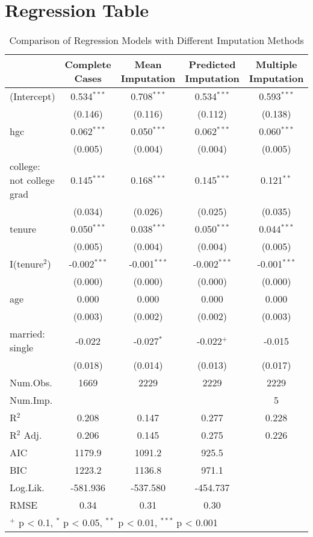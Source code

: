 \documentclass{article}
\begin{document}
\section{Regression Table}
\begin{table}[htbp]
\centering
\begin{tabular}{lcccc}
\hline
 & Complete Cases & Mean Imputation & Predicted Imputation & Multiple Imputation \\
\hline
(Intercept) & 0.534$^{***}$ & 0.708$^{***}$ & 0.534$^{***}$ & 0.593$^{***}$ \\
 & (0.146) & (0.116) & (0.112) & (0.138) \\
hgc & 0.062$^{***}$ & 0.050$^{***}$ & 0.062$^{***}$ & 0.060$^{***}$ \\
 & (0.005) & (0.004) & (0.004) & (0.005) \\
college: not college grad & 0.145$^{***}$ & 0.168$^{***}$ & 0.145$^{***}$ & 0.121$^{**}$ \\
 & (0.034) & (0.026) & (0.025) & (0.035) \\
tenure & 0.050$^{***}$ & 0.038$^{***}$ & 0.050$^{***}$ & 0.044$^{***}$ \\
 & (0.005) & (0.004) & (0.004) & (0.005) \\
I(tenure$^2$) & -0.002$^{***}$ & -0.001$^{***}$ & -0.002$^{***}$ & -0.001$^{***}$ \\
 & (0.000) & (0.000) & (0.000) & (0.000) \\
age & 0.000 & 0.000 & 0.000 & 0.000 \\
 & (0.003) & (0.002) & (0.002) & (0.003) \\
married: single & -0.022 & -0.027$^{*}$ & -0.022$^{+}$ & -0.015 \\
 & (0.018) & (0.014) & (0.013) & (0.017) \\
\hline
Num.Obs. & 1669 & 2229 & 2229 & 2229 \\
Num.Imp. &  &  &  & 5 \\
R$^2$ & 0.208 & 0.147 & 0.277 & 0.228 \\
R$^2$ Adj. & 0.206 & 0.145 & 0.275 & 0.226 \\
AIC & 1179.9 & 1091.2 & 925.5 &  \\
BIC & 1223.2 & 1136.8 & 971.1 &  \\
Log.Lik. & -581.936 & -537.580 & -454.737 &  \\
RMSE & 0.34 & 0.31 & 0.30 &  \\
\hline
\multicolumn{5}{l}{$^{+}$ p < 0.1, $^{*}$ p < 0.05, $^{**}$ p < 0.01, $^{***}$ p < 0.001} \\
\hline
\end{tabular}
\caption{Comparison of Regression Models with Different Imputation Methods}
\label{tab:imputation_comparison}
\end{table}
\end{document}
